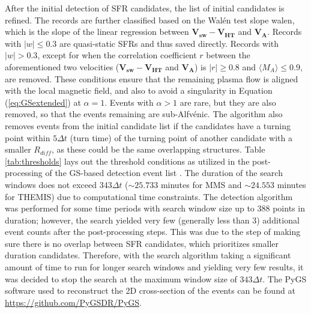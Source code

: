 After the initial detection of SFR candidates, the list of initial candidates is refined. The records are further classified based on the Wal\'en test slope \gls{walen}, which is the slope of the linear regression between $\mathbf{V_{sw}} - \mathbf{V_{HT}}$ and $\mathbf{V_A}$. Records with $|w|\leq0.3$ are quasi-static SFRs and thus saved directly. Records with $|w|>0.3$, except for when the correlation coefficient $r$ between the aforementioned two velocities ($\mathbf{V_{sw}} - \mathbf{V_{HT}}$ and $\mathbf{V_A}$) is $|r|\geq 0.8$ and $\langle M_A\rangle \leq 0.9$, are removed. These conditions ensure that the remaining plasma flow is aligned with the local magnetic field, and also to avoid a singularity in Equation (\ref{eq:GSextended}) at $\alpha=1$. Events with $\alpha>1$ are rare, but they are also removed, so that the events remaining are sub-Alfv\'enic. The algorithm also removes events from the initial candidate list if the candidates have a turning point within $5\Delta t$ (turn time) of the turning point of another candidate with a smaller $R_{diff}$, as these could be the same overlapping structures. Table \ref{tab:thresholds} lays out the threshold conditions as utilized in the post-processing of the GS-based detection event list \citep{Chen:2020, Chen:2021, Chen:2022}. The duration of the search windows does not exceed 343$\Delta t$ ($\sim 25.733$ minutes for MMS and $\sim 24.553$ minutes for THEMIS) due to computational time constraints. The detection algorithm was performed for some time periods with search window size up to 388 points in duration; however, the search yielded very few (generally less than 3) additional event counts after the post-processing steps. This was due to the step of making sure there is no overlap between SFR candidates, which prioritizes smaller duration candidates. Therefore, with the search algorithm taking a significant amount of time to run for longer search windows and yielding very few results, it was decided to stop the search at the maximum window size of $343\Delta t$. The PyGS software used to reconstruct the 2D cross-section of the events can be found at \url{https://github.com/PyGSDR/PyGS}.


